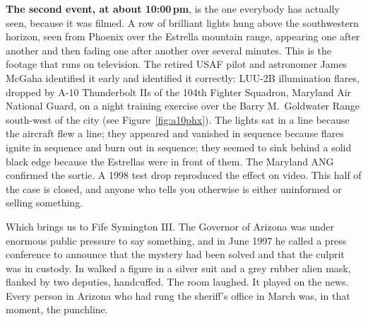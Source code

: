 \textbf{The second event, at about 10:00\,pm}, is the one everybody has actually seen, because it
was filmed. A row of brilliant lights hung above the southwestern horizon, seen from Phoenix
over the Estrella mountain range, appearing one after another and then fading one after another
over several minutes. This is the footage that runs on television. The retired USAF pilot and
astronomer James McGaha identified it early and identified it correctly: LUU-2B illumination
flares, dropped by A-10 Thunderbolt IIs of the 104th Fighter Squadron, Maryland Air National
Guard, on a night training exercise over the Barry M.\ Goldwater Range south-west of the city
(see Figure~\ref{fig:a10phx}). The lights sat in a line because the aircraft flew a line; they
appeared and vanished in sequence because flares ignite in sequence and burn out in sequence;
they seemed to sink behind a solid black edge because the Estrellas were in front of them. The
Maryland ANG confirmed the sortie. A 1998 test drop reproduced the effect on video. This half of
the case is closed, and anyone who tells you otherwise is either uninformed or selling
something.


Which brings us to Fife Symington III. The Governor of Arizona was under enormous public
pressure to say something, and in June 1997 he called a press conference to announce that the
mystery had been solved and that the culprit was in custody. In walked a figure in a silver suit
and a grey rubber alien mask, flanked by two deputies, handcuffed. The room laughed. It played on
the news. Every person in Arizona who had rung the sheriff's office in March was, in that
moment, the punchline.


